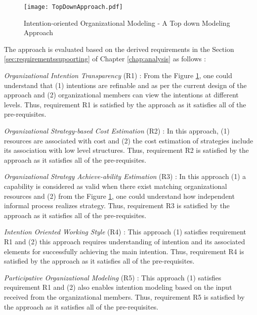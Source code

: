 \begin{figure}
	\centering
	\texttt{[image: TopDownApproach.pdf]}
	\caption{Intention-oriented Organizational Modeling - A Top down Modeling Approach}
	\label{fig:topdownapproach}
\end{figure}

The approach is evaluated based on the derived requirements in the Section \ref{sec:requirementssupoorting} of Chapter \ref{chap:analysis} as follows :

\textit{Organizational Intention Transparency} (R1) : From the Figure \ref{fig:topdownapproach}, one could understand that (1) intentions are refinable and as per the current design of the approach and (2) organizational members can view the intentions at different levels. Thus, requirement R1 is satisfied by the approach as it satisfies all of the pre-requisites. 

\textit{Organizational Strategy-based Cost Estimation} (R2) :  In this approach, (1) resources are associated with cost and (2) the cost estimation of strategies include its association with low level structures. Thus, requirement R2 is satisfied by the approach as it satisfies all of the pre-requisites. 

\textit{Organizational Strategy Achieve-ability Estimation} (R3) :  In this approach (1) a capability is considered as valid when there exist matching organizational resources and (2) from the Figure \ref{fig:topdownapproach}, one could understand how independent informal process realizes strategy. Thus, requirement R3 is satisfied by the approach as it satisfies all of the pre-requisites.

\textit{Intention Oriented Working Style} (R4) : This approach (1) satisfies requirement R1 and (2) this approach requires understanding of intention and its associated elements for successfully achieving the main intention. Thus, requirement R4 is satisfied by the approach as it satisfies all of the pre-requisites.

\textit{Participative Organizational Modeling} (R5) : This approach (1) satisfies requirement R1 and  (2) also enables intention modeling based on the input received from the organizational members. Thus, requirement R5 is satisfied by the approach as it satisfies all of the pre-requisites. 



